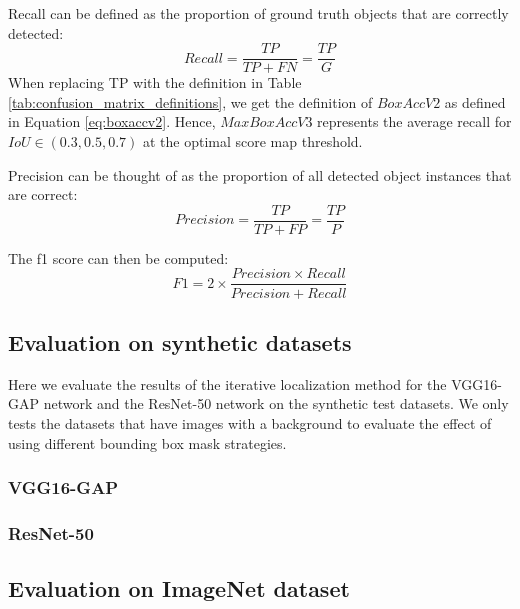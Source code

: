 Recall can be defined as the proportion of ground truth objects that are correctly detected:
\begin{equation}
Recall = \frac{TP}{TP + FN} = \frac{TP}{G}
\end{equation}
When replacing TP with the definition in Table \ref{tab:confusion_matrix_definitions}, we get the definition of $BoxAccV2$ as defined in Equation \ref{eq:boxaccv2}. Hence, 
$MaxBoxAccV3$ represents the average recall for $IoU \in (0.3, 0.5, 0.7)$ at the optimal score map threshold.

Precision can be thought of as the proportion of all detected object instances that are correct:
\begin{equation}
Precision = \frac{TP}{TP + FP} = \frac{TP}{P}
\end{equation}

The f1 score can then be computed:
\begin{equation}
F1 = 2 \times \frac{Precision \times Recall}{Precision + Recall}
\end{equation}

\subsection{Evaluation on synthetic datasets}
Here we evaluate the results of the iterative localization method for the VGG16-GAP network and the ResNet-50 network on the synthetic test datasets. We only tests the datasets that have images with a background to evaluate the effect of using different bounding box mask strategies.

\subsubsection{VGG16-GAP}


\subsubsection{ResNet-50}

\subsection{Evaluation on ImageNet dataset}

